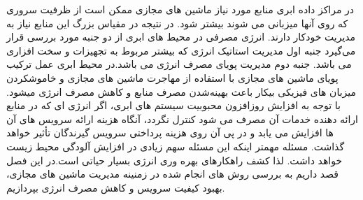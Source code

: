   در مراکز داده ابری منابع مورد نیاز ماشین های مجازی ممکن است از ظرفیت سروری که روی آنها میزبانی می شوند بیشتر شود. در نتیجه در مقیاس بزرگ این منابع نیاز به مدیریت خودکار دارند. انرژی مصرفی در محیط های ابری از دو جنبه مورد بررسی قرار  می‌گیرد جنبه اول مدیریت استاتیک انرژی که بیشتر مربوط به تجهیزات و سخت افزاری می باشد. جنبه دوم مدیریت پویای مصرف انرژی می باشد.در محیط ابری عمل  ترکیب پویای ماشین های مجازی با استفاده از مهاجرت ماشین های مجازی و خاموش­کردن میزبان های فیزیکی بیکار باعث 
 بهینه‌شدن   مصرف منابع و کاهش مصرف انرژی می­شود­. با توجه به افزایش روزافزون محبوبیت سیستم های ابری، اگر انرژی ای که در منابع ارائه دهنده خدمات آن مصرف می شود کنترل نگردد، آنگاه هزینه ارائه سرویس های آن ها  افزایش می یابد و در پی آن روی هزینه پرداختی سرویس گیرندگان تأثیر خواهد گذاشت. مسئله مهمتر اینکه این مسئله سهم زیادی در افزایش آلودگی محیط زیست خواهد داشت. لذا کشف راهکارهای بهره وری انرژی بسیار حیاتی است.در این فصل قصد داریم به بررسی روش های انجام شده در زمنینه مدیریت ماشین های مجازی، بهبود کیفیت سرویس و کاهش مصرف انرژی بپردازیم.
 
